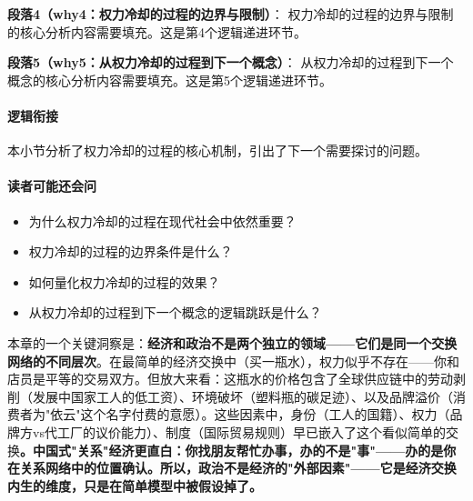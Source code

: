 \documentclass[../main.tex]{subfiles}
\begin{document}
\textbf{段落4（why4：权力冷却的过程的边界与限制）}：
权力冷却的过程的边界与限制的核心分析内容需要填充。这是第4个逻辑递进环节。


\textbf{段落5（why5：从权力冷却的过程到下一个概念）}：
从权力冷却的过程到下一个概念的核心分析内容需要填充。这是第5个逻辑递进环节。


\paragraph*{逻辑衔接}
本小节分析了权力冷却的过程的核心机制，引出了下一个需要探讨的问题。

\paragraph*{读者可能还会问}
\begin{itemize}
\item 为什么权力冷却的过程在现代社会中依然重要？
\item 权力冷却的过程的边界条件是什么？
\item 如何量化权力冷却的过程的效果？
\item 从权力冷却的过程到下一个概念的逻辑跳跃是什么？
\end{itemize}

	本章的一个关键洞察是：\textbf{经济和政治不是两个独立的领域——它们是同一个交换网络的不同层次}。在最简单的经济交换中（买一瓶水），权力似乎不存在——你和店员是平等的交易双方。但放大来看：这瓶水的价格包含了全球供应链中的劳动剥削（发展中国家工人的低工资）、环境破坏（塑料瓶的碳足迹）、以及品牌溢价（消费者为"依云"这个名字付费的意愿）。这些因素中，身份（工人的国籍）、权力（品牌方vs代工厂的议价能力）、制度（国际贸易规则）早已嵌入了这个看似简单的交换\textbf{。中国式"关系"经济更直白：你找朋友帮忙办事，办的不是"事"——办的是\textbf{你在关系网络中的位置确认}。所以，政治不是经济的"外部因素"——它是经济交换\textbf{内生的维度}，只是在简单模型中被假设掉了。}
\end{document}
